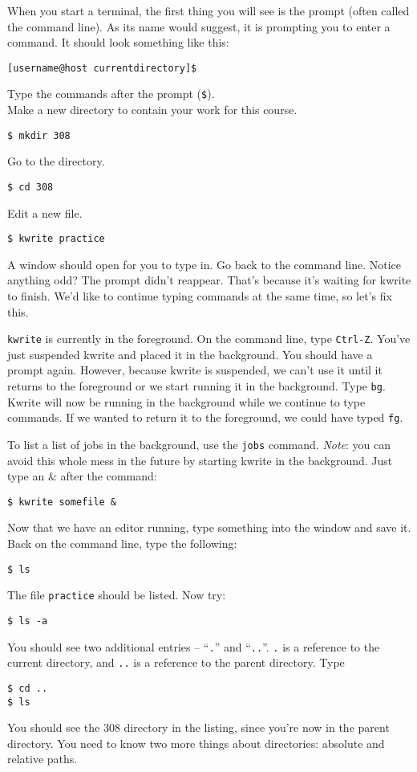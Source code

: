 \documentclass[letterpaper,10pt]{article}
\newcommand{\cmd}[1]{\texttt{#1}}
\begin{document}
When you start a terminal, the first thing you will see is the prompt (often called the command line). As its name would suggest, it is prompting you to enter a command. It should look something like this:

\begin{verbatim}
[username@host currentdirectory]$
\end{verbatim}
Type the commands after the prompt (\verb+$+). \\
Make a new directory to contain your work for this course.
\begin{verbatim}
$ mkdir 308
\end{verbatim}
Go to the directory.
\begin{verbatim}
$ cd 308
\end{verbatim}
Edit a new file.
\begin{verbatim}
$ kwrite practice
\end{verbatim}
A window should open for you to type in. Go back to the command line. Notice anything odd? The prompt didn't reappear. That's because it's waiting for kwrite to finish. We'd like to continue typing commands at the same time, so let's fix this.

\cmd{kwrite} is currently in the foreground. On the command line, type \cmd{Ctrl-Z}. You've just suspended kwrite and placed it in the background. You should have a prompt again. However, because kwrite is suspended, we can't use it until it returns to the foreground or we start running it in the background. Type \cmd{bg}. Kwrite will now be running in the background while we continue to type commands. If we wanted to return it to the foreground, we could have typed \cmd{fg}.

To list a list of jobs in the background, use the \cmd{jobs} command. \emph{Note}: you can avoid this whole mess in the future by starting kwrite in the background. Just type an \& after the command:
\begin{verbatim}
$ kwrite somefile &
\end{verbatim}
Now that we have an editor running, type something into the window and save it.
Back on the command line, type the following:
\begin{verbatim}
$ ls
\end{verbatim}
The file \texttt{practice} should be listed. Now try:
\begin{verbatim}
$ ls -a
\end{verbatim}
You should see two additional entries -- ``\texttt{.}'' and ``\texttt{..}''.
\texttt{.} is a reference to the current directory, and \texttt{..} is a reference to the parent directory. Type
\begin{verbatim}
$ cd ..
$ ls
\end{verbatim}
You should see the 308 directory in the listing, since you're now in the parent directory. You need to know two more things about directories: absolute and relative paths.
\end{document}
